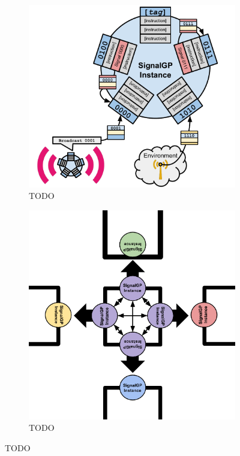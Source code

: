 \begin{figure}[t]
\begin{center}

\begin{subfigure}[b]{\columnwidth}
\includegraphics[width=\textwidth]{img/signalgp-cartoon}%
\caption{TODO}
\label{fig:TODO}
\end{subfigure}%
\begin{subfigure}[b]{\columnwidth}
\includegraphics[width=\textwidth]{img/dishtinygp-cartoon}
\caption{TODO}
\label{fig:TODO}
\end{subfigure}

\caption{TODO}
\label{fig:signalgp-dishtinygp}

\end{center}
\end{figure}
